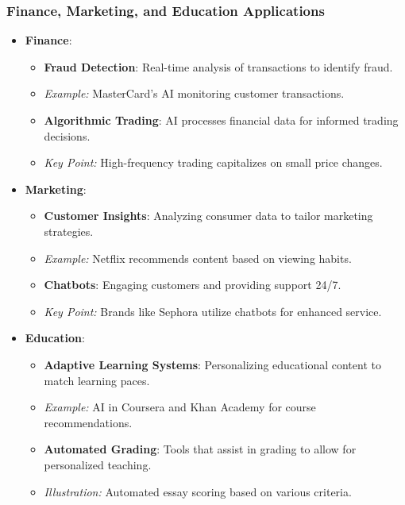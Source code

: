 \documentclass[aspectratio=169]{beamer}
\begin{document}
\begin{frame}[fragile]
    \frametitle{Finance, Marketing, and Education Applications}
    \begin{itemize}
        \item \textbf{Finance}:
        \begin{itemize}
            \item \textbf{Fraud Detection}: Real-time analysis of transactions to identify fraud.
            \item \textit{Example:} MasterCard's AI monitoring customer transactions.
            \item \textbf{Algorithmic Trading}: AI processes financial data for informed trading decisions.
            \item \textit{Key Point:} High-frequency trading capitalizes on small price changes.
        \end{itemize}
        
        \item \textbf{Marketing}:
        \begin{itemize}
            \item \textbf{Customer Insights}: Analyzing consumer data to tailor marketing strategies.
            \item \textit{Example:} Netflix recommends content based on viewing habits.
            \item \textbf{Chatbots}: Engaging customers and providing support 24/7.
            \item \textit{Key Point:} Brands like Sephora utilize chatbots for enhanced service.
        \end{itemize}
        
        \item \textbf{Education}:
        \begin{itemize}
            \item \textbf{Adaptive Learning Systems}: Personalizing educational content to match learning paces.
            \item \textit{Example:} AI in Coursera and Khan Academy for course recommendations.
            \item \textbf{Automated Grading}: Tools that assist in grading to allow for personalized teaching.
            \item \textit{Illustration:} Automated essay scoring based on various criteria.
        \end{itemize}
    \end{itemize}
\end{frame}
\end{document}
